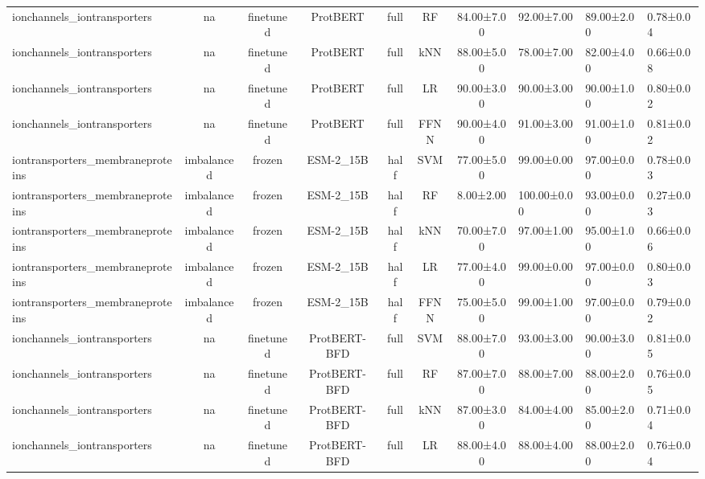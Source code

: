 \begin{tabular}{lcccccc}
     ionchannels\_iontransporters &         na &      finetuned &     ProtBERT &      full &         RF &  84.00±7.00 &  92.00±7.00 &  89.00±2.00 & 0.78±0.04 \\
     ionchannels\_iontransporters &         na &      finetuned &     ProtBERT &      full &        kNN &  88.00±5.00 &  78.00±7.00 &  82.00±4.00 & 0.66±0.08 \\
     ionchannels\_iontransporters &         na &      finetuned &     ProtBERT &      full &         LR &  90.00±3.00 &  90.00±3.00 &  90.00±1.00 & 0.80±0.02 \\
     ionchannels\_iontransporters &         na &      finetuned &     ProtBERT &      full &       FFNN &  90.00±4.00 &  91.00±3.00 &  91.00±1.00 & 0.81±0.02 \\
iontransporters\_membraneproteins & imbalanced &         frozen &    ESM-2\_15B &      half &        SVM &  77.00±5.00 &  99.00±0.00 &  97.00±0.00 & 0.78±0.03 \\
iontransporters\_membraneproteins & imbalanced &         frozen &    ESM-2\_15B &      half &         RF &   8.00±2.00 & 100.00±0.00 &  93.00±0.00 & 0.27±0.03 \\
iontransporters\_membraneproteins & imbalanced &         frozen &    ESM-2\_15B &      half &        kNN &  70.00±7.00 &  97.00±1.00 &  95.00±1.00 & 0.66±0.06 \\
iontransporters\_membraneproteins & imbalanced &         frozen &    ESM-2\_15B &      half &         LR &  77.00±4.00 &  99.00±0.00 &  97.00±0.00 & 0.80±0.03 \\
iontransporters\_membraneproteins & imbalanced &         frozen &    ESM-2\_15B &      half &       FFNN &  75.00±5.00 &  99.00±1.00 &  97.00±0.00 & 0.79±0.02 \\
     ionchannels\_iontransporters &         na &      finetuned & ProtBERT-BFD &      full &        SVM &  88.00±7.00 &  93.00±3.00 &  90.00±3.00 & 0.81±0.05 \\
     ionchannels\_iontransporters &         na &      finetuned & ProtBERT-BFD &      full &         RF &  87.00±7.00 &  88.00±7.00 &  88.00±2.00 & 0.76±0.05 \\
     ionchannels\_iontransporters &         na &      finetuned & ProtBERT-BFD &      full &        kNN &  87.00±3.00 &  84.00±4.00 &  85.00±2.00 & 0.71±0.04 \\
     ionchannels\_iontransporters &         na &      finetuned & ProtBERT-BFD &      full &         LR &  88.00±4.00 &  88.00±4.00 &  88.00±2.00 & 0.76±0.04 \\

\end{tabular}
